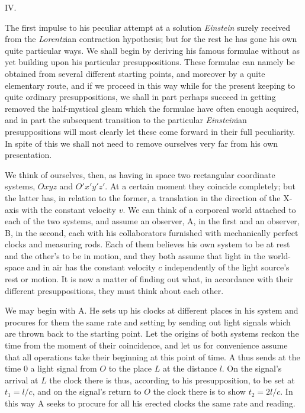 \documentclass[12pt,a4paper]{article}
\begin{document}
\begin{center}
IV.
\end{center}

The first impulse to his peculiar attempt at a solution \emph{Einstein} surely
received from the \emph{Lorentz}ian contraction hypothesis; but for the rest
he has gone his own quite particular ways. We shall begin by deriving his
famous formulae without as yet building upon his particular presuppositions.
These formulae can namely be obtained from several different starting points,
and moreover by a quite elementary route, and if we proceed in this way while
for the present keeping to quite ordinary presuppositions, we shall in part
perhaps succeed in getting removed the half-mystical gleam which the formulae
have often enough acquired, and in part the subsequent transition to the
particular \emph{Einstein}ian presuppositions will most clearly let these come
forward in their full peculiarity. In spite of this we shall not need to
remove ourselves very far from his own presentation.

We think of ourselves, then, as having in space two rectangular coordinate
systems, $Oxyz$ and $O'x'y'z'$. At a certain moment they coincide completely;
but the latter has, in relation to the former, a translation in the direction
of the X-axis with the constant velocity $v$. We can think of a corporeal
world attached to each of the two systems, and assume an observer, A, in the
first and an observer, B, in the second, each with his collaborators furnished
with mechanically perfect clocks and measuring rods. Each of them believes his
own system to be at rest and the other's to be in motion, and they both assume
that light in the world-space and in air has the constant velocity $c$
independently of the light source's rest or motion. It is now a matter of
finding out what, in accordance with their different presuppositions, they
must think about each other.

We may begin with A. He sets up his clocks at different places in his system
and procures for them the same rate and setting by sending out light signals
which are thrown back to the starting point. Let the origins of both systems
reckon the time from the moment of their coincidence, and let us for
convenience assume that all operations take
their beginning at this point of time. A thus sends at the time 0 a light
signal from $O$ to the place $L$ at the distance $l$. On the signal's arrival
at $L$ the clock there is thus, according to his presupposition, to be set at
$t_{1} = l/c$, and on the signal's return to $O$ the clock there is to show
$t_{2} = 2l/c$. In this way A seeks to procure for all his erected clocks the
same rate and reading.
\end{document}
